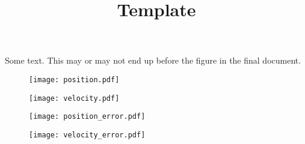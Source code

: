 \documentclass{article}
\title{Template} %
\begin{document}
\maketitle %

Some text. This may or may not end up before the figure in the final document.


\begin{figure}
\texttt{[image: position.pdf]}
\end{figure}

\begin{figure}
\texttt{[image: velocity.pdf]}
\end{figure}

\begin{figure}
\texttt{[image: position\_error.pdf]}
\end{figure}

\begin{figure}
\texttt{[image: velocity\_error.pdf]}
\end{figure}
\end{document}
